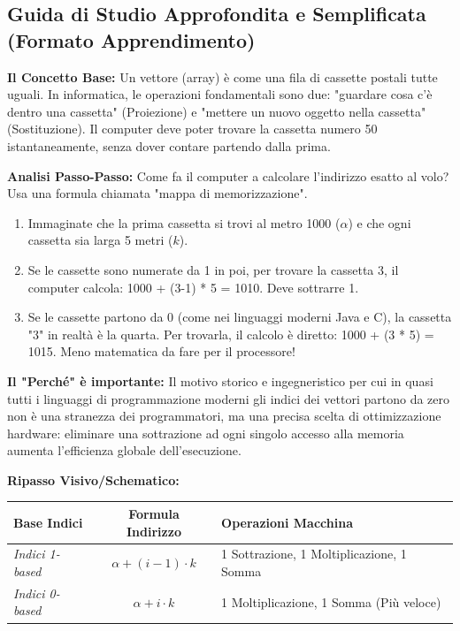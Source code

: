 \documentclass[a4paper, 11pt]{report}
\begin{document}
\vspace{0.5cm}
\subsection*{Guida di Studio Approfondita e Semplificata (Formato Apprendimento)}

\textbf{Il Concetto Base:}
Un vettore (array) è come una fila di cassette postali tutte uguali. In informatica, le operazioni fondamentali sono due: "guardare cosa c'è dentro una cassetta" (Proiezione) e "mettere un nuovo oggetto nella cassetta" (Sostituzione). Il computer deve poter trovare la cassetta numero 50 istantaneamente, senza dover contare partendo dalla prima.

\textbf{Analisi Passo-Passo:}
Come fa il computer a calcolare l'indirizzo esatto al volo? Usa una formula chiamata "mappa di memorizzazione".
\begin{enumerate}
    \item Immaginate che la prima cassetta si trovi al metro 1000 ($\alpha$) e che ogni cassetta sia larga 5 metri ($k$).
    \item Se le cassette sono numerate da 1 in poi, per trovare la cassetta 3, il computer calcola: 1000 + (3-1) * 5 = 1010. Deve sottrarre 1.
    \item Se le cassette partono da 0 (come nei linguaggi moderni Java e C), la cassetta "3" in realtà è la quarta. Per trovarla, il calcolo è diretto: 1000 + (3 * 5) = 1015. Meno matematica da fare per il processore!
\end{enumerate}

\textbf{Il "Perché" è importante:}
Il motivo storico e ingegneristico per cui in quasi tutti i linguaggi di programmazione moderni gli indici dei vettori partono da zero non è una stranezza dei programmatori, ma una precisa scelta di ottimizzazione hardware: eliminare una sottrazione ad ogni singolo accesso alla memoria aumenta l'efficienza globale dell'esecuzione.

\textbf{Ripasso Visivo/Schematico:}
\begin{center}
\begin{tabular}{|l|c|p{6cm}|}
\hline
\textbf{Base Indici} & \textbf{Formula Indirizzo} & \textbf{Operazioni Macchina} \\
\hline
\textit{Indici 1-based} & $\alpha + (i - 1) \cdot k$ & 1 Sottrazione, 1 Moltiplicazione, 1 Somma \\
\hline
\textit{Indici 0-based} & $\alpha + i \cdot k$ & 1 Moltiplicazione, 1 Somma (Più veloce) \\
\hline
\end{tabular}
\end{center}
\end{document}
